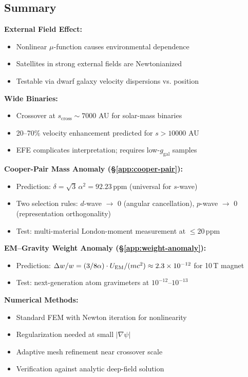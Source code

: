 \subsection{Summary}\label{app:extended-summary}

\begin{tcolorbox}[colback=green!5!white, colframe=green!60!black, title=Extended Phenomenology Summary]
\textbf{External Field Effect:}
\begin{itemize}[nosep]
\item Nonlinear $\mu$-function causes environmental dependence
\item Satellites in strong external fields are Newtonianized
\item Testable via dwarf galaxy velocity dispersions vs. position
\end{itemize}

\textbf{Wide Binaries:}
\begin{itemize}[nosep]
\item Crossover at $s_{\mathrm{cross}} \sim 7000$ AU for solar-mass binaries
\item 20--70\% velocity enhancement predicted for $s > 10000$ AU
\item EFE complicates interpretation; requires low-$g_{\mathrm{gal}}$ samples
\end{itemize}

\textbf{Cooper-Pair Mass Anomaly (\S\ref{app:cooper-pair}):}
\begin{itemize}[nosep]
\item Prediction: $\delta = \sqrt{3}\,\alpha^2 = 92.23$\,ppm (universal for $s$-wave)
\item Two selection rules: $d$-wave $\to$ 0 (angular cancellation), $p$-wave $\to$ 0 (representation orthogonality)
\item Test: multi-material London-moment measurement at $\leq 20$\,ppm
\end{itemize}

\textbf{EM--Gravity Weight Anomaly (\S\ref{app:weight-anomaly}):}
\begin{itemize}[nosep]
\item Prediction: $\Delta w/w = (3/8\alpha) \cdot U_{\rm EM}/(mc^2) \approx 2.3\times10^{-12}$ for 10\,T magnet
\item Test: next-generation atom gravimeters at $10^{-12}$--$10^{-13}$
\end{itemize}

\textbf{Numerical Methods:}
\begin{itemize}[nosep]
\item Standard FEM with Newton iteration for nonlinearity
\item Regularization needed at small $|\nabla\psi|$
\item Adaptive mesh refinement near crossover scale
\item Verification against analytic deep-field solution
\end{itemize}
\end{tcolorbox}
